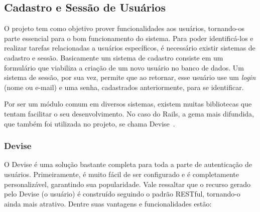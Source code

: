 \subsection{Cadastro e Sessão de Usuários}

O projeto tem como objetivo prover funcionalidades aos usuários, tornando-os parte essencial para o bom funcionamento do sistema. Para poder identificá-los e realizar tarefas relacionadas a usuários específicos, é necessário existir sistemas de cadastro e sessão. Basicamente um sistema de cadastro consiste em um formulário que viabiliza a criação de um novo usuário no banco de dados. Um sistema de sessão, por sua vez, permite que ao retornar, esse usuário use um \textit{login} (nome ou e-mail) e uma senha, cadastrados anteriormente, para se identificar.

Por ser um módulo comum em diversos sistemas, existem muitas bibliotecas que tentam facilitar o seu desenvolvimento. No caso do Rails, a gema mais difundida, que também foi utilizada no projeto, se chama Devise~\cite{devise}.

\subsubsection{Devise}

O Devise é uma solução bastante completa para toda a parte de autenticação de usuários. Primeiramente, é muito fácil de ser configurado e é completamente personalizável, garantindo sua popularidade. Vale ressaltar que o recurso gerado pelo Devise (o usuário) é construído seguindo o padrão RESTful, tornando-o ainda mais atrativo. Dentre suas vantagens e funcionalidades estão:

